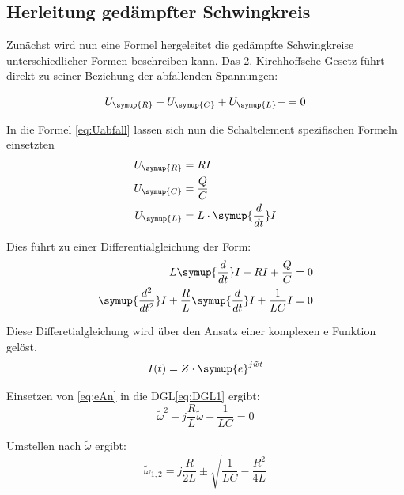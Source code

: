    
    \subsection{Herleitung gedämpfter Schwingkreis}

    
    \noindent Zunächst wird nun eine Formel hergeleitet die gedämpfte Schwingkreise unterschiedlicher Formen beschreiben kann.
    Das 2. Kirchhoffsche Gesetz führt direkt zu seiner Beziehung der abfallenden Spannungen:

    \begin{equation}
    U_{\symup{R}} + U_{\symup{C}} + U_{\symup{L}} +  = 0     
    \label{eq:Uabfall}
    \end{equation}

    \noindent In die Formel \ref{eq:Uabfall} lassen sich nun die Schaltelement spezifischen Formeln  einsetzten
    \begin{align}
        U_{\symup{R}} & = RI \nonumber\\
        U_{\symup{C}} & = \frac{Q}{C}\nonumber\\
        U_{\symup{L}} & = L \cdot \symup{\frac{d}{dt}}I \nonumber
    \end{align}

    \noindent Dies führt zu einer Differentialgleichung der Form:
    \begin{align}
        L  \symup{\frac{d}{dt}}I + RI + \frac{Q}{C} & = 0 \nonumber\\
        \symup{\frac{d^2}{dt^2}}I + \frac{R}{L} \symup{\frac{d}{dt}}I + \frac{1}{LC}I & = 0 
        \label{eq:DGL1}
    \end{align}
    
    \noindent Diese Differetialgleichung wird über den Ansatz einer komplexen e Funktion gelöst.
    \begin{equation}
        I(t) = Z \cdot \symup{e}^{j \tilde{w} t}
        \label{eq:eAn}
    \end{equation}

    \noindent Einsetzen von \ref{eq:eAn} in die DGL\ref{eq:DGL1} ergibt:
    \begin{equation}
        \tilde{\omega}^2 - j \frac{R}{L}\tilde{\omega} - \frac{1}{LC} = 0 \nonumber
    \end{equation}

    \noindent Umstellen nach $\tilde{\omega}$ ergibt:
    \begin{equation}
        \tilde{\omega}_{1,2} = j \frac{R}{2L} \pm \sqrt{\frac{1}{LC}-\frac{R^2}{4L}} \nonumber
    \end{equation}
    
